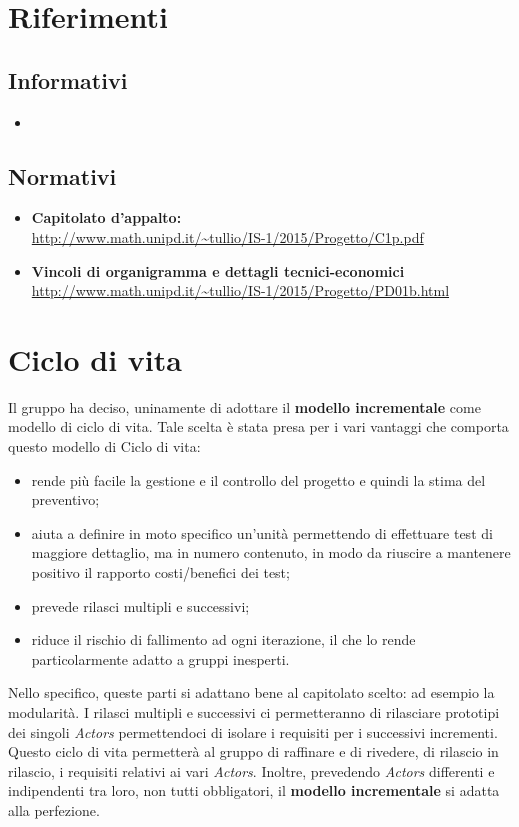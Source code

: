 \documentclass[a4paper]{report}
\begin{document}
		\section{Riferimenti}
			\subsection{Informativi}
				\begin{itemize}
					\item 
				\end{itemize}
			\subsection{Normativi}
				\begin{itemize}
					\item \textbf{Capitolato d'appalto: } \\ \url{http://www.math.unipd.it/~tullio/IS-1/2015/Progetto/C1p.pdf}
					\item \textbf{Vincoli di organigramma e dettagli tecnici-economici} \\ 
					\url{http://www.math.unipd.it/~tullio/IS-1/2015/Progetto/PD01b.html}
				\end{itemize}
		\section{Ciclo di vita}
			Il gruppo ha deciso, uninamente di adottare il \textbf{modello incrementale} come modello di ciclo di vita.
			Tale scelta è stata presa per i vari vantaggi che comporta questo modello di Ciclo di vita:
			\begin{itemize}
				\item rende più facile la gestione e il controllo del progetto e quindi la stima del preventivo;
				\item aiuta a definire in moto specifico un'unità permettendo di effettuare test di maggiore dettaglio, ma 
				in numero contenuto, in modo da riuscire a mantenere positivo il rapporto costi/benefici dei test;
				\item prevede rilasci multipli e successivi;
				\item riduce il rischio di fallimento ad ogni iterazione, il che lo rende particolarmente adatto a gruppi 
				inesperti.
			\end{itemize}
			
			Nello specifico, queste parti si adattano bene al capitolato scelto: ad esempio la modularità. I rilasci 
			multipli e successivi ci permetteranno di rilasciare prototipi dei singoli \emph{Actors} permettendoci di
			isolare i requisiti per i successivi incrementi. Questo ciclo di vita permetterà al gruppo di raffinare e 
			di rivedere, di rilascio in rilascio, i requisiti relativi ai vari \emph{Actors}. Inoltre, prevedendo 
			\emph{Actors} differenti e indipendenti tra loro, non tutti obbligatori, il \textbf{modello incrementale} 
			si adatta alla perfezione.
			
\end{document}
